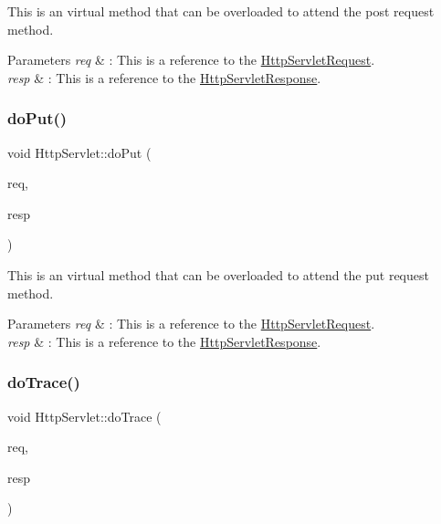 This is an virtual method that can be overloaded to attend the post request method. 


\begin{DoxyParams}{Parameters}
{\em req} & \+: This is a reference to the \mbox{\hyperlink{class_http_servlet_request}{Http\+Servlet\+Request}}. \\
\hline
{\em resp} & \+: This is a reference to the \mbox{\hyperlink{class_http_servlet_response}{Http\+Servlet\+Response}}. \\
\hline
\end{DoxyParams}
\mbox{\label{class_http_servlet_a33edf48c6762b1c9f5e7faaf47135073}} 
\subsubsection{\texorpdfstring{do\+Put()}{doPut()}}
{\footnotesize\ttfamily void Http\+Servlet\+::do\+Put (\begin{DoxyParamCaption}\item[{\mbox{\hyperlink{class_http_servlet_request}{Http\+Servlet\+Request}} \&}]{req,  }\item[{\mbox{\hyperlink{class_http_servlet_response}{Http\+Servlet\+Response}} \&}]{resp }\end{DoxyParamCaption})\hspace{0.3cm}{\ttfamily [virtual]}}



This is an virtual method that can be overloaded to attend the put request method. 


\begin{DoxyParams}{Parameters}
{\em req} & \+: This is a reference to the \mbox{\hyperlink{class_http_servlet_request}{Http\+Servlet\+Request}}. \\
\hline
{\em resp} & \+: This is a reference to the \mbox{\hyperlink{class_http_servlet_response}{Http\+Servlet\+Response}}. \\
\hline
\end{DoxyParams}
\mbox{\label{class_http_servlet_a42a6a6a556f43b3447d4ff56d9d574cb}} 
\subsubsection{\texorpdfstring{do\+Trace()}{doTrace()}}
{\footnotesize\ttfamily void Http\+Servlet\+::do\+Trace (\begin{DoxyParamCaption}\item[{\mbox{\hyperlink{class_http_servlet_request}{Http\+Servlet\+Request}} \&}]{req,  }\item[{\mbox{\hyperlink{class_http_servlet_response}{Http\+Servlet\+Response}} \&}]{resp }\end{DoxyParamCaption})\hspace{0.3cm}{\ttfamily [virtual]}}



